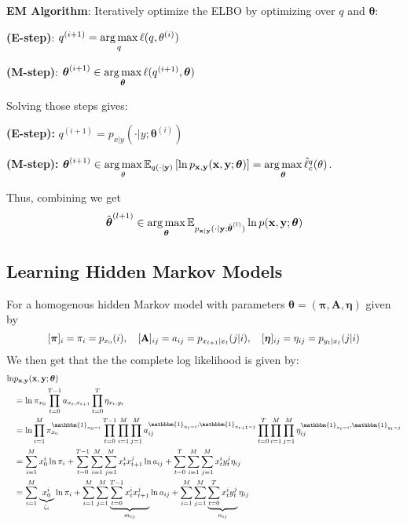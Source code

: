 \documentclass[9pt]{article}
\begin{document}
\begin{multicols}{2}
\textbf{EM Algorithm}: Iteratively optimize the ELBO by optimizing
over $q$ and $\boldsymbol{\theta}$:

\textbf{(E-step)}: $q^{(i+1)} = \operatorname*{arg\,max}\limits_q  \ell (q, \theta^{(i)})$

\textbf{(M-step)}: $\boldsymbol{\theta}^{(i+1)} \in \operatorname*{arg\,max}\limits_{\boldsymbol{\theta}}  \ell (q^{(i+1)}, \boldsymbol{\theta})$

Solving those steps gives:

\textbf{(E-step):}  $q^{(i+1)} = p_{x|y}(\cdot|y; \boldsymbol{\theta}^(i))$

\textbf{(M-step):} $\boldsymbol{\theta}^{(i+1)} \in \operatorname*{arg\,max}\limits_\theta \mathbb{E}_{q(\cdot|\mathbf{y})}\left[\ln p_{\mathbf{x},\mathbf{y}}(\mathbf{x},\mathbf{y}; \boldsymbol{\theta}) \right]=\operatorname*{arg\,max}\limits_{\boldsymbol{\theta}}\hat\ell^{q}_{c}(\theta)$.

Thus, combining we get
$$\hat{\boldsymbol{\theta}}^{(l+1)} \in \operatorname*{arg\,max}\limits_{\boldsymbol{\theta}}\mathbb{E}_{p_{\mathbf{x}|\mathbf{y}}(\cdot|\mathbf{y};\hat{\boldsymbol{\theta}}^{(l)})}\ln p(\mathbf{x},\mathbf{y};\boldsymbol{\theta})$$

\subsection{Learning Hidden Markov Models}

For a homogenous hidden Markov model with parameters $\boldsymbol{\theta} = (\boldsymbol{\pi}, \mathbf{A}, \boldsymbol{\eta})$ given by
\[
\scalebox{0.9}{
\(
[\boldsymbol{\pi}]_i=\pi_i=p_{x_0}(i), \quad [\mathbf{A}]_{ij}=a_{ij}=p_{x_{t+1}|x_{t}}(j|i), \quad [\boldsymbol{\eta}]_{ij}=\eta_{ij}=p_{y_t|x_t}(j|i)
\)
}
\]
We then get that the the complete log likelihood is given by:
\begin{align*}
\ln & p_{\mathbf{x,y}}(\mathbf{x,y};\boldsymbol{\theta}) \\
&= \ln \pi_{x_0}\prod_{t=0}^{T-1}a_{x_t,x_{t+1}}\prod_{t=0}^{T}
\eta_{x_t,y_t} \\
&= \ln \prod_{i=1}^{M} \pi_{x_0}^{\mathbbm{1}_{x_0=i}}\prod_{t=0}^{T-1}\prod_{i=1}^{M}\prod_{j=1}^{M}a_{ij}^{\mathbbm{1}_{x_t=i},\mathbbm{1}_{x_{t+1}=j}}\prod_{t=0}^{T}\prod_{i=1}^{M}\prod_{j=1}^{M}
\eta_{ij}^{\mathbbm{1}_{x_t=i},\mathbbm{1}_{y_t=j}} \\
&= \sum_{i=1}^{M}x_0^i\ln\pi_i+\sum_{t=0}^{T-1}\sum_{i=1}^{M}\sum_{j=1}^{M}x_t^ix_{t+1}^{j}\ln a_{ij}+\sum_{t=0}^{T}\sum_{i=1}^{M}\sum_{j=1}^{M}x_t^iy_t^j\eta_{ij}\\
&= \sum_{i=1}^{M}\underbrace{x_0^i}_{\zeta_i}\ln\pi_i+\sum_{i=1}^{M}\sum_{j=1}^{M}\underbrace{\sum_{t=0}^{T-1}x_t^ix_{t+1}^{j}}_{m_{ij}}\ln a_{ij}+\sum_{i=1}^{M}\sum_{j=1}^{M}\underbrace{\sum_{t=0}^{T}x_t^iy_t^j}_{n_{ij}}\eta_{ij}
\end{align*}


\end{multicols}
\end{document}

